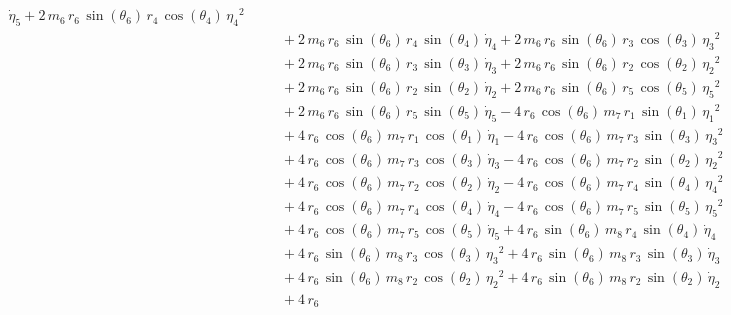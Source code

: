 \begin{eqnarray*}
{\dot{\eta}_{5}} + 2\,m_{6}\,r_{6}\,\sin({\theta_{6}})\,r_{4}\,\cos({
\theta_{4}})\,{{\eta_{4}}}^2 \\ &&\quad\mbox{} + 2\,m_{6}\,r_{6}\,\sin
({\theta_{6}})\,r_{4}\,\sin({\theta_{4}})\,{\dot{\eta}_{4}} + 2\,m_{6}
\,r_{6}\,\sin({\theta_{6}})\,r_{3}\,\cos({\theta_{3}})\,{{\eta_{3}}}^2
 \\ &&\quad\mbox{} + 2\,m_{6}\,r_{6}\,\sin({\theta_{6}})\,r_{3}\,\sin(
{\theta_{3}})\,{\dot{\eta}_{3}} + 2\,m_{6}\,r_{6}\,\sin({\theta_{6}})
\,r_{2}\,\cos({\theta_{2}})\,{{\eta_{2}}}^2 \\ &&\quad\mbox{} + 2\,m_{
6}\,r_{6}\,\sin({\theta_{6}})\,r_{2}\,\sin({\theta_{2}})\,{\dot{\eta}
_{2}} + 2\,m_{6}\,r_{6}\,\sin({\theta_{6}})\,r_{5}\,\cos({\theta_{5}})
\,{{\eta_{5}}}^2 \\ &&\quad\mbox{} + 2\,m_{6}\,r_{6}\,\sin({\theta_{6}
})\,r_{5}\,\sin({\theta_{5}})\,{\dot{\eta}_{5}} - 4\,r_{6}\,\cos({
\theta_{6}})\,m_{7}\,r_{1}\,\sin({\theta_{1}})\,{{\eta_{1}}}^2
 \\ &&\quad\mbox{} + 4\,r_{6}\,\cos({\theta_{6}})\,m_{7}\,r_{1}\,\cos(
{\theta_{1}})\,{\dot{\eta}_{1}} - 4\,r_{6}\,\cos({\theta_{6}})\,m_{7}
\,r_{3}\,\sin({\theta_{3}})\,{{\eta_{3}}}^2 \\ &&\quad\mbox{} + 4\,r_{
6}\,\cos({\theta_{6}})\,m_{7}\,r_{3}\,\cos({\theta_{3}})\,{\dot{\eta}
_{3}} - 4\,r_{6}\,\cos({\theta_{6}})\,m_{7}\,r_{2}\,\sin({\theta_{2}})
\,{{\eta_{2}}}^2 \\ &&\quad\mbox{} + 4\,r_{6}\,\cos({\theta_{6}})\,m_{
7}\,r_{2}\,\cos({\theta_{2}})\,{\dot{\eta}_{2}} - 4\,r_{6}\,\cos({
\theta_{6}})\,m_{7}\,r_{4}\,\sin({\theta_{4}})\,{{\eta_{4}}}^2
 \\ &&\quad\mbox{} + 4\,r_{6}\,\cos({\theta_{6}})\,m_{7}\,r_{4}\,\cos(
{\theta_{4}})\,{\dot{\eta}_{4}} - 4\,r_{6}\,\cos({\theta_{6}})\,m_{7}
\,r_{5}\,\sin({\theta_{5}})\,{{\eta_{5}}}^2 \\ &&\quad\mbox{} + 4\,r_{
6}\,\cos({\theta_{6}})\,m_{7}\,r_{5}\,\cos({\theta_{5}})\,{\dot{\eta}
_{5}} + 4\,r_{6}\,\sin({\theta_{6}})\,m_{8}\,r_{4}\,\sin({\theta_{4}})
\,{\dot{\eta}_{4}} \\ &&\quad\mbox{} + 4\,r_{6}\,\sin({\theta_{6}})\,m
_{8}\,r_{3}\,\cos({\theta_{3}})\,{{\eta_{3}}}^2 + 4\,r_{6}\,\sin({
\theta_{6}})\,m_{8}\,r_{3}\,\sin({\theta_{3}})\,{\dot{\eta}_{3}}
 \\ &&\quad\mbox{} + 4\,r_{6}\,\sin({\theta_{6}})\,m_{8}\,r_{2}\,\cos(
{\theta_{2}})\,{{\eta_{2}}}^2 + 4\,r_{6}\,\sin({\theta_{6}})\,m_{8}\,r
_{2}\,\sin({\theta_{2}})\,{\dot{\eta}_{2}} \\ &&\quad\mbox{} + 4\,r_{6
}
\end{eqnarray*}
